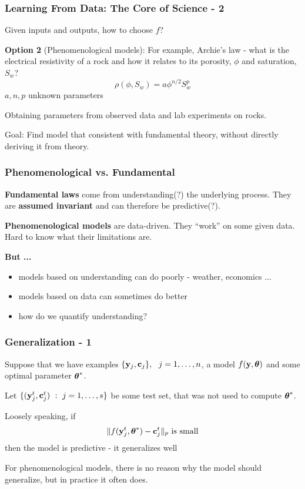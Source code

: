 \documentclass[12pt,fleqn]{beamer}
\begin{document}
\begin{frame}\frametitle{Learning From Data: The Core of Science - 2}



Given inputs and outputs, how to choose $f$?

\bigskip

\textbf{Option 2} (Phenomenological models): For example, Archie's law - what is the electrical resistivity of a rock
 and how it relates to its porosity, $\phi$ and saturation, $S_w$?
$$ \rho(\phi,S_w) = a \phi^{n/2} S_w^p $$
$a,n,p$ unknown parameters


\bigskip

Obtaining parameters from observed data and lab experiments on rocks.

\bigskip

Goal: Find model that consistent with fundamental theory, without directly deriving it from theory.


\end{frame}


\begin{frame}\frametitle{Phenomenological vs. Fundamental}

\textbf{Fundamental laws} come from understanding(?) the underlying process.
They are {\bf assumed invariant} and can therefore be predictive(?).

\bigskip

\textbf{Phenomenological models} are data-driven. They ``work'' on some given data.
Hard to know what their limitations are.

\bigskip

{\bf But ...}
\begin{itemize}
\item models based on understanding can do poorly - weather, economics ...
\item models based on data can sometimes do better
\item how do we quantify understanding?
\end{itemize}

\end{frame}



\begin{frame}\frametitle{Generalization - 1}

Suppose that we have examples $\{{\bf y}_j,{\bf c}_j\},\ \ j=1,\ldots,n$,
a model $f({\bf y},{\boldsymbol \theta})$ and some optimal parameter ${\boldsymbol \theta}^*$.

Let $\{({\bf y}^t_j,{\bf c}^t_j) \ : \  j=1,\ldots,s\}$ be some test set, that was not used
to compute ${\boldsymbol \theta}^*$.

\bigskip
\pause

Loosely speaking, if
$$ \|f({\bf y}^t_j,{\boldsymbol \theta}^*) - {\bf c}_j^t\|_p \text{ is small}$$
then the model is predictive - it generalizes well



\pause
\bigskip


For phenomenological models, there is no reason why the model
should generalize, but in practice it often does.


\end{frame}
\end{document}
